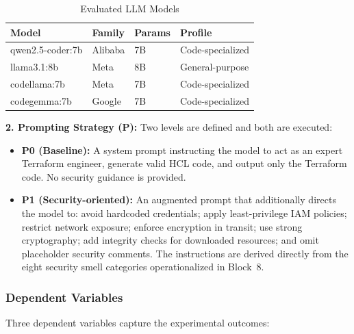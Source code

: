\begin{table}[htbp]
\centering
\caption{Evaluated LLM Models}
\label{tab:models}
\begin{tabular}{@{}llll@{}}
\toprule
\textbf{Model} & \textbf{Family} & \textbf{Params} & \textbf{Profile} \\
\midrule
qwen2.5-coder:7b  & Alibaba    & 7B  & Code-specialized \\
llama3.1:8b        & Meta       & 8B  & General-purpose \\
codellama:7b       & Meta       & 7B  & Code-specialized \\
codegemma:7b       & Google     & 7B  & Code-specialized \\
\bottomrule
\end{tabular}
\end{table}

\textbf{2. Prompting Strategy (P):} Two levels are defined and both
are executed:
\begin{itemize}
    \item \textbf{P0 (Baseline):} A system prompt instructing the
          model to act as an expert Terraform engineer, generate
          valid HCL code, and output only the Terraform code. No
          security guidance is provided.
    \item \textbf{P1 (Security-oriented):} An augmented prompt that
          additionally directs the model to: avoid hardcoded
          credentials; apply least-privilege IAM policies; restrict
          network exposure; enforce encryption in transit; use strong
          cryptography; add integrity checks for downloaded resources;
          and omit placeholder security comments. The instructions
          are derived directly from the eight security smell
          categories operationalized in Block~8.
\end{itemize}

\subsubsection{Dependent Variables}

Three dependent variables capture the experimental outcomes:

